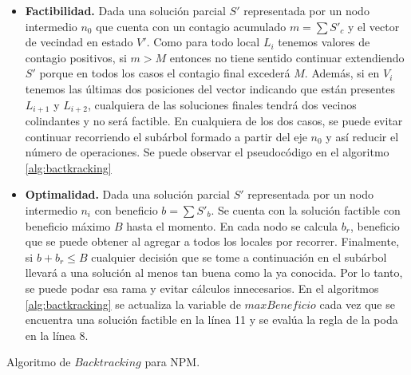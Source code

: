 \begin{itemize}
    \item \textbf{Factibilidad.} Dada una solución parcial $S'$ representada por un nodo intermedio $n_0$ que cuenta con un contagio acumulado $m=\sum S'_c$ y el vector de vecindad en estado $V'$. Como para todo local $L_i$ tenemos valores de contagio positivos, si $m>M$ entonces no tiene sentido continuar extendiendo $S'$ porque en todos los casos el contagio final excederá $M$. Además, si en $V_i$ tenemos las últimas dos posiciones del vector indicando que están presentes $L_{i+1}$ y $L_{i+2}$, cualquiera de las soluciones finales tendrá dos vecinos colindantes y no será factible. En cualquiera de los dos casos, se puede evitar continuar recorriendo el subárbol formado a partir del eje $n_0$ y así reducir el número de operaciones. Se puede observar el pseudocódigo en el algoritmo \ref{alg:bactkracking}
    \item \textbf{Optimalidad.} Dada una solución parcial $S'$ representada por un nodo intermedio $n_i$ con beneficio $b=\sum S'_b$. Se cuenta con la solución factible con beneficio máximo $B$ hasta el momento. En cada nodo se calcula $b_r$, beneficio que se puede obtener al agregar a todos los locales por recorrer. Finalmente, si $b + b_r\le B$ cualquier decisión que se tome a continuación en el subárbol llevará a una solución al menos tan buena como la ya conocida. Por lo tanto, se puede podar esa rama y evitar cálculos innecesarios. En el algoritmos \ref{alg:bactkracking} se actualiza la variable de $maxBeneficio$ cada vez que se encuentra una solución factible en la línea 11 y se evalúa la regla de la poda en la línea 8.
\end{itemize}

\begin{algorithm}
    \begin{algorithmic}[1]
            \EndIf
            \EndIf
            \EndIf
            \EndIf
        \EndFunction
    \end{algorithmic}
    \caption{Algoritmo de $Backtracking$ para NPM.}
    \label{alg:bactkracking}
\end{algorithm}

